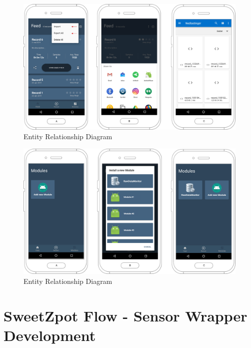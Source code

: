 \begin{figure}
    \centering
    \includegraphics[scale=0.26]{images/Sharing_img.pdf}
    \caption{Entity Relationship Diagram}
    \label{fig:impl_modules}
\end{figure}


\begin{figure}
    \centering
    \includegraphics[scale=0.26]{images/Modules_img.pdf}
    \caption{Entity Relationship Diagram}
    \label{fig:impl_modules}
\end{figure}



\section{SweetZpot Flow - Sensor Wrapper Development}